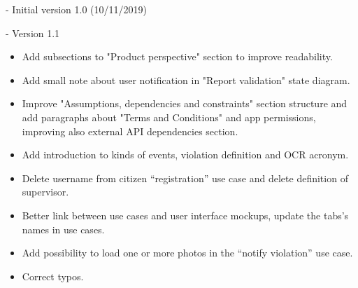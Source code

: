 - Initial version 1.0 (10/11/2019)

- Version 1.1
\begin{itemize}
	\item Add subsections to "Product perspective" section to improve readability.
	\item Add small note about user notification in "Report validation" state diagram. 
	\item Improve "Assumptions, dependencies and constraints" section structure and add paragraphs about "Terms and Conditions" and app permissions, improving also external API dependencies section.
	\item Add introduction to kinds of events, violation definition and OCR acronym.
	\item Delete username from citizen “registration” use case and delete definition of supervisor.
	\item Better link between use cases and user interface mockups, update the tabs’s names in use cases.
	\item Add possibility to load one or more photos in the “notify violation” use case.
	\item Correct typos.
\end{itemize}